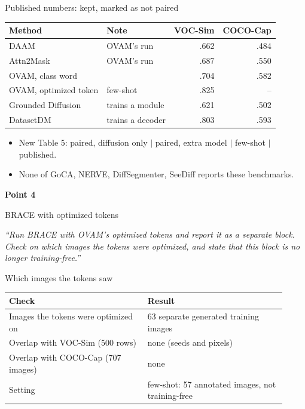 \documentclass[aspectratio=169,11pt]{beamer}
\newcommand{\pointcover}[3]{%
\begin{frame}[plain]
\vfill
\begin{center}
{\LARGE\bfseries Point #1}\par\vspace{0.6em}
{\Large #2}\par\vspace{1.4em}
\begin{minipage}{0.78\linewidth}\centering\itshape #3\end{minipage}
\end{center}
\vfill
\end{frame}}
\begin{document}
\begin{frame}{Published numbers: kept, marked as not paired}
\begin{slidetable}
\begin{tabular}{@{}llrr@{}}
\toprule
Method & Note & VOC-Sim & COCO-Cap \\
\midrule
DAAM & OVAM's run & .662 & .484 \\
Attn2Mask & OVAM's run & .687 & .550 \\
OVAM, class word & & .704 & .582 \\
OVAM, optimized token & few-shot & .825 & -- \\
Grounded Diffusion & trains a module & .621 & .502 \\
DatasetDM & trains a decoder & .803 & .593 \\
\bottomrule
\end{tabular}
\end{slidetable}
\begin{itemize}
\item New Table 5: paired, diffusion only $\mid$ paired, extra model $\mid$ few-shot $\mid$ published.
\item None of GoCA, NERVE, DiffSegmenter, SeeDiff reports these benchmarks.
\end{itemize}
\end{frame}

\pointcover{4}{BRACE with optimized tokens}{``Run BRACE with OVAM's optimized tokens and report it as a separate block. Check on which images the tokens were optimized, and state that this block is no longer training-free.''}

\begin{frame}{Which images the tokens saw}
\begin{slidetable}
\begin{tabular}{@{}L{0.46\linewidth}L{0.46\linewidth}@{}}
\toprule
Check & Result \\
\midrule
Images the tokens were optimized on & 63 separate generated training images \\
Overlap with VOC-Sim (500 rows) & none (seeds and pixels) \\
Overlap with COCO-Cap (707 images) & none \\
Setting & few-shot: 57 annotated images, not training-free \\
\bottomrule
\end{tabular}
\end{slidetable}
\end{frame}
\end{document}

